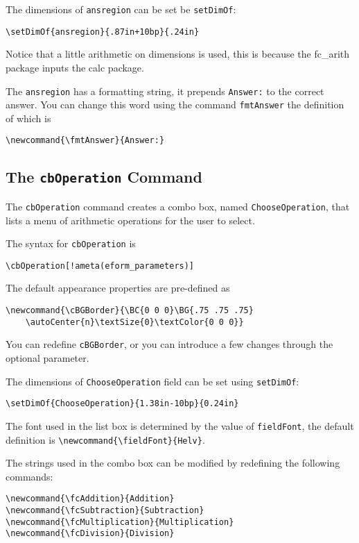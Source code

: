 \documentclass{article}
\makeatletter
\let\bslash=\@backslashchar
\def\cs#1{\texttt{\bslash#1}}
\makeatother
\begin{document}
The dimensions of \texttt{ansregion} can be set be \cs{setDimOf}:
\begin{Verbatim}[xleftmargin=\amtIndent]
\setDimOf{ansregion}{.87in+10bp}{.24in}
\end{Verbatim}
Notice that a little arithmetic on dimensions is used, this is because the
\textsf{fc\_arith} package inputs the \textsf{calc} package.

The \texttt{ansregion} has a formatting string, it prepends \texttt{Answer:}
to the correct answer. You can change this word using the command
\cs{fmtAnswer} the definition of which is
\begin{Verbatim}[xleftmargin=\amtIndent]
\newcommand{\fmtAnswer}{Answer:}
\end{Verbatim}

\subsection{The \texorpdfstring{\protect\cs{cbOperation}}{} Command}\label{cbOperation}

The \cs{cbOperation} command creates a combo box, named
\texttt{ChooseOperation}, that lists a menu of arithmetic operations for the
user to select.

The syntax for \cs{cbOperation} is
\begin{Verbatim}[xleftmargin=\amtIndent,commandchars=!()]
\cbOperation[!ameta(eform_parameters)]
\end{Verbatim}
The default appearance properties are pre-defined as
\begin{Verbatim}[xleftmargin=\amtIndent]
\newcommand{\cBGBorder}{\BC{0 0 0}\BG{.75 .75 .75}
    \autoCenter{n}\textSize{0}\textColor{0 0 0}}
\end{Verbatim}
You can redefine \cs{cBGBorder}, or you can introduce a few changes through
the optional parameter.

The dimensions of \texttt{ChooseOperation} field can be set using \cs{setDimOf}:
\begin{Verbatim}[xleftmargin=\amtIndent]
\setDimOf{ChooseOperation}{1.38in-10bp}{0.24in}
\end{Verbatim}
The font used in the list box is determined by the value of \cs{fieldFont},
the default definition is \verb!\newcommand{\fieldFont}{Helv}!.

The strings used in the combo box can be modified by redefining the following commands:
\begin{Verbatim}[xleftmargin=\amtIndent]
\newcommand{\fcAddition}{Addition}
\newcommand{\fcSubtraction}{Subtraction}
\newcommand{\fcMultiplication}{Multiplication}
\newcommand{\fcDivision}{Division}
\end{Verbatim}
\end{document}

